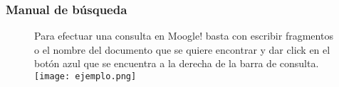 \documentclass{beamer}
\begin{document}
\begin{frame}[fragile]
    \frametitle{Manual de b\'usqueda}
    \begin{figure}
    \Large Para efectuar una consulta en Moogle! basta con escribir fragmentos o el nombre del documento que se quiere encontrar y dar click en el bot\'on azul que se encuentra a la derecha de la barra de consulta.\\
    \texttt{[image: ejemplo.png]}
    \end{figure}
\end{frame}
\end{document}
